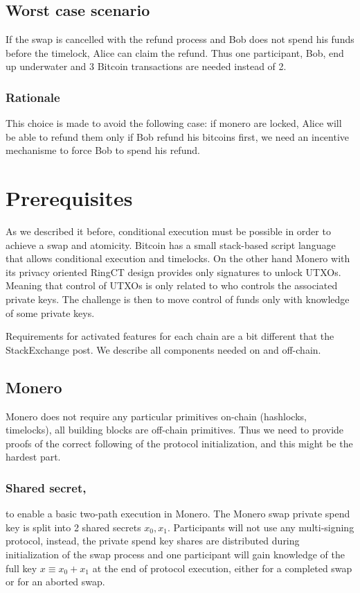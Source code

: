 \documentclass{llncs}
\begin{document}
\subsection{Worst case scenario}
If the swap is cancelled with the refund process and Bob does not spend his funds before the timelock, Alice can claim the refund. Thus one participant, Bob, end up underwater and 3 Bitcoin transactions are needed instead of 2.

\subsubsection{Rationale}
\label{worstCaseRationale}
This choice is made to avoid the following case: if monero are locked, Alice will be able to refund them only if Bob refund his bitcoins first, we need an incentive mechanisme to force Bob to spend his refund.

\section{Prerequisites}
As we described it before, conditional execution must be possible in order to achieve a swap and atomicity. Bitcoin has a small stack-based script language that allows conditional execution and timelocks. On the other hand Monero with its privacy oriented RingCT design provides only signatures to unlock UTXOs. Meaning that control of UTXOs is only related to who controls the associated private keys. The challenge is then to move control of funds only with knowledge of some private keys.

Requirements for activated features for each chain are a bit different that the StackExchange post. We describe all components needed on and off-chain.

\subsection{Monero}
Monero does not require any particular primitives on-chain (hashlocks, timelocks), all building blocks are off-chain primitives. Thus we need to provide proofs of the correct following of the protocol initialization, and this might be the hardest part.

\subsubsection{Shared secret,}
to enable a basic two-path execution in Monero. The Monero swap private spend key is split into 2 shared secrets $x_0, x_1$. Participants will not use any multi-signing protocol, instead, the private spend key shares are distributed during initialization of the swap process and one participant will gain knowledge of the full key $x \equiv x_0 + x_1$ at the end of protocol execution, either for a completed swap or for an aborted swap.
\end{document}
